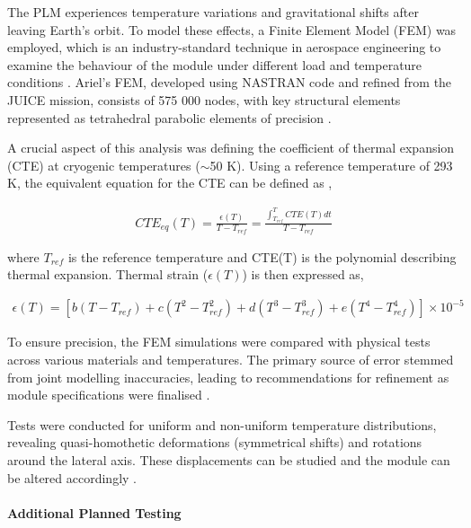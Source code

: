\documentclass[12pt]{article}
\begin{document}
The PLM experiences temperature variations and gravitational shifts after leaving Earth's orbit. To model these effects, a Finite Element Model (FEM) was employed, which is an industry-standard technique in aerospace engineering to examine the behaviour of the module under different load and temperature conditions \cite{Garcia-Perez_Alonso_Gomez-San-Juan_Perez-Alvarez_2021}.
Ariel's FEM, developed using NASTRAN code and refined from the JUICE mission, consists of 575 000 nodes, with key structural elements represented as tetrahedral parabolic elements of precision \cite{Garcia-Perez_Alonso_Gomez-San-Juan_Perez-Alvarez_2021}.

A crucial aspect of this analysis was defining the coefficient of thermal expansion (CTE) at cryogenic temperatures ($\sim$50 K). Using a reference temperature of 293 K, the equivalent equation for the CTE can be defined as \cite{Garcia-Perez_Alonso_Gomez-San-Juan_Perez-Alvarez_2021},

\vspace{-2ex}
\begin{gather*}
    CTE_{eq}(T) = \frac{\epsilon (T)}{T-T_{ref}} = \frac{\int^T_{T_{ref}} CTE(T) dt}{T-T_{ref}}
\end{gather*}

where $T_{ref}$ is the reference temperature and CTE(T) is the polynomial describing thermal expansion. Thermal strain ($\epsilon (T)$) is then expressed as,

\vspace{-2ex}
\begin{gather*}
    \epsilon (T) = [b(T-T_{ref}) + c(T^2 - T^2_{ref}) + d(T^3-T^3_{ref}) + e(T^4-T^4_{ref})] \times 10^{-5}
\end{gather*}

To ensure precision, the FEM simulations were compared with physical tests across various materials and temperatures. The primary source of error stemmed from joint modelling inaccuracies, leading to recommendations for refinement as module
specifications were finalised \cite{Garcia-Perez_Alonso_Gomez-San-Juan_Perez-Alvarez_2021}.

Tests were conducted for uniform and non-uniform temperature distributions, revealing quasi-homothetic deformations (symmetrical shifts) and rotations around the lateral axis. These displacements can be studied and the module can be altered accordingly \cite{Garcia-Perez_Alonso_Gomez-San-Juan_Perez-Alvarez_2021}.

\paragraph{Additional Planned Testing} ~\\
\end{document}
